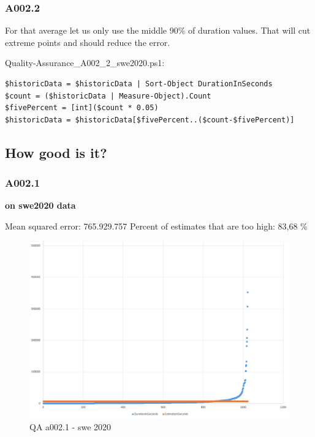 \hypertarget{a002.2}{%
\subsubsection{A002.2}\label{a002.2}}

For that average let us only use the middle 90\% of duration values.
That will cut extreme points and should reduce the error.

Quality-Assurance\_A002\_2\_swe2020.ps1:

\begin{verbatim}
$historicData = $historicData | Sort-Object DurationInSeconds
$count = ($historicData | Measure-Object).Count
$fivePercent = [int]($count * 0.05)
$historicData = $historicData[$fivePercent..($count-$fivePercent)]
\end{verbatim}

\hypertarget{how-good-is-it}{%
\subsection{How good is it?}\label{how-good-is-it}}

\hypertarget{a002.1-1}{%
\subsubsection{A002.1}\label{a002.1-1}}

\textbf{on swe2020 data}

Mean squared error: 765.929.757 Percent of estimates that are too high:
83,68 \%

\begin{figure}
\centering
\includegraphics{Documentation/10000-A002/a002_1-swe2020.png}
\caption{QA a002.1 - swe 2020}
\end{figure}

